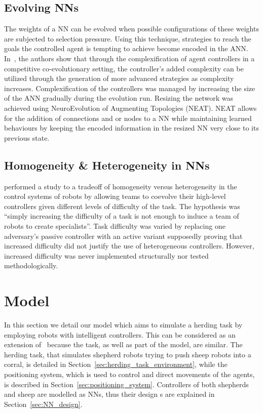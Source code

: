 \documentclass[conference]{IEEEtran}
\begin{document}
\subsection{Evolving NNs}
The weights of a NN can be evolved when possible configurations of these weights are subjected to selection pressure.
Using this technique, strategies to reach the goals the controlled agent is tempting to achieve become encoded in the ANN.
In~\cite{stanley2004competitive}, the authors show that through the complexification of agent controllers in a competitive co-evolutionary setting, the controller's added complexity can be utilized through the generation of more advanced strategies as complexity increases. 
Complexification of the controllers was managed by increasing the size of the ANN gradually during the evolution run.
Resizing the network was achieved using NeuroEvolution of Augmenting Topologies (NEAT).
NEAT allows for the addition of connections and or nodes to a NN while maintaining learned behaviours by keeping the encoded information in the resized NN very close to its previous state.

\subsection{Homogeneity \& Heterogeneity in NNs}
\cite{potter2001heterogeneity} performed a study to a tradeoff of homogeneity versus heterogeneity in the control systems of robots by allowing teams to coevolve their high-level controllers given different levels of difficulty of the task.
The hypothesis was ``simply increasing the difficulty of a task is not enough to induce a team of robots to create specialists''.
Task difficulty was varied by replacing one adversary's passive controller with an active variant supposedly proving that increased difficulty did not justify the use of heterogeneous controllers.
However, increased difficulty was never implemented structurally nor tested methodologically. 

\section{Model}
In this section we detail our model which aims to simulate a herding task by employing robots with intelligent controllers.
This can be considered as an extension of~\cite{potter2001heterogeneity} because the task, as well as part of the model, are similar. 
The herding task, that simulates shepherd robots trying to push sheep robots into a corral, is detailed in Section~\ref{sec:herding_task_environment},
while the positioning system, which is used to control and direct movements of the agents, is described in Section~\ref{sec:positioning_system}. 
Controllers of both shepherds and sheep are modelled as NNs, thus their design s are explained in Section~\ref{sec:NN_design}.
\end{document}
